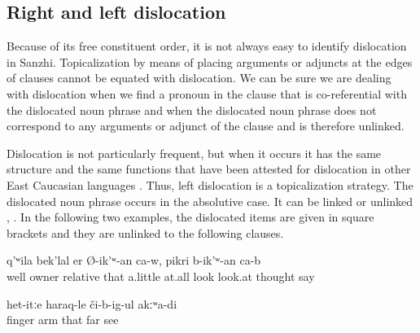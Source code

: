 \subsection{Right and left dislocation}
\label{ssec:Right and left dislocation}

Because of its free constituent order, it is not always easy to identify dislocation in Sanzhi. Topicalization by means of placing arguments or adjuncts at the edges of clauses cannot be equated with dislocation. We can be sure we are dealing with dislocation when we find a pronoun in the clause that is co-referential with the dislocated noun phrase and when the dislocated noun phrase does not correspond to any arguments or adjunct of the clause and is therefore unlinked.

Dislocation is not particularly frequent, but when it occurs it has the same structure and the same functions that have been attested for dislocation in other East Caucasian languages \citep{Forker.Belyaev2016}. Thus, left dislocation is a topicalization strategy. The dislocated noun phrase occurs in the absolutive case. It can be linked or unlinked , . In the following two examples, the dislocated items are given in square brackets and they are unlinked to the following clauses.
%
\begin{exe}
	\ex	\label{ex:Well, also those own relatives, and those who do not have (relatives), one has to look after them a bit, think of them}
	\gll	[nu	ix-tːi	w-ah-la	tuχum-te=ra		il-tːi	akːʷ-ar-te=ra]	q'ʷila	bek'lal	er	Ø-ik'ʷ-an	ca-w,	pikri	b-ik'ʷ-an	ca-b\\
		well		owner	relative		that		a.little	at.all	look	look.at\tsc{.ipfv-ptcp} 		thought	say	\\
	\glt	{}

	\ex	\label{ex:‎The fingers, the hands, I do not see that far}
	\gll	[t'upː-e=ra	nuˁq-be=ra=q'al]	het-itːe	haraq-le	či-b-ig-ul	akːʷa-di\\
		finger	arm	that\tsc{-advz}	far	see	\\
	\glt	{}
\end{exe}

